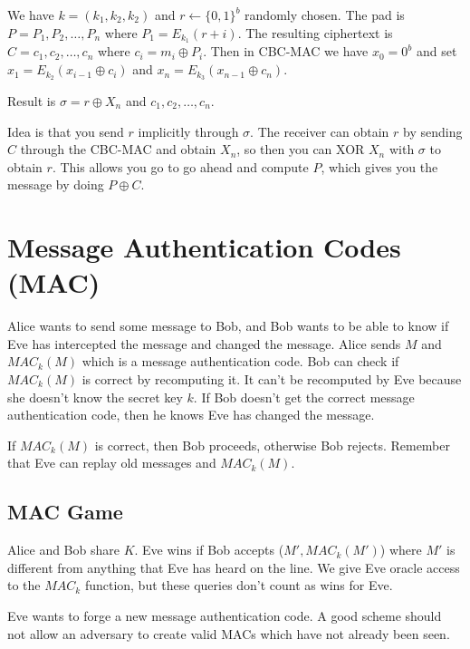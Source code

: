 \documentclass[psamsfonts]{amsart}
\begin{document}
We have $k = (k_1, k_2, k_2)$ and $r \leftarrow \{0, 1\}^b$ randomly chosen. The pad is $P = P_1, P_2, \ldots, P_n$ where $P_1 = E_{k_1} ( r + i)$. The resulting ciphertext is $C = c_1, c_2, \ldots, c_n$ where $c_i = m_i \oplus P_i$. Then in CBC-MAC we have $x_0 = 0^b$ and set $x_1 = E_{k_2} (x_{i-1} \oplus c_i)$ and $x_n = E_{k_3} (x_{n-1} \oplus c_n)$. 

Result is $\sigma = r \oplus X_n$ and $c_1, c_2, \ldots, c_n$. 

Idea is that you send $r$ implicitly through $\sigma$. The receiver can obtain $r$ by sending $C$ through the CBC-MAC and obtain $X_n$, so then you can XOR $X_n$ with $\sigma$ to obtain $r$. This allows you go to go ahead and compute $P$, which gives you the message by doing $P \oplus C$.

\section{Message Authentication Codes (MAC)}

Alice wants to send some message to Bob, and Bob wants to be able to know if Eve has intercepted the message and changed the message. Alice sends $M$ and $MAC_{k}(M)$ which is a message authentication code. Bob can check if $MAC_{k}(M)$ is correct by recomputing it. It can't be recomputed by Eve because she doesn't know the secret key $k$. If Bob doesn't get the correct message authentication code, then he knows Eve has changed the message.

If $MAC_{k}(M)$ is correct, then Bob proceeds, otherwise Bob rejects. Remember that Eve can replay old messages and $MAC_{k}(M)$.

\subsection{MAC Game}

Alice and Bob share $K$. Eve wins if Bob accepts ($M', MAC_{k}(M')$) where $M'$ is different from anything that Eve has heard on the line. We give Eve oracle access to the $MAC_{k}$ function, but these queries don't count as wins for Eve.

Eve wants to forge a new message authentication code. A good scheme should not allow an adversary to create valid MACs which have not already been seen.
\end{document}
